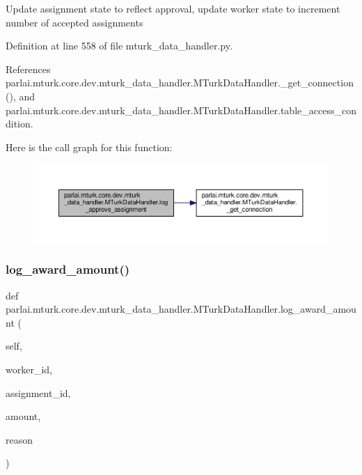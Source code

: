 \begin{DoxyVerb}Update assignment state to reflect approval, update worker state to
increment number of accepted assignments
\end{DoxyVerb}
 

Definition at line 558 of file mturk\+\_\+data\+\_\+handler.\+py.



References parlai.\+mturk.\+core.\+dev.\+mturk\+\_\+data\+\_\+handler.\+M\+Turk\+Data\+Handler.\+\_\+get\+\_\+connection(), and parlai.\+mturk.\+core.\+dev.\+mturk\+\_\+data\+\_\+handler.\+M\+Turk\+Data\+Handler.\+table\+\_\+access\+\_\+condition.

Here is the call graph for this function\+:
\nopagebreak
\begin{figure}[H]
\begin{center}
\leavevmode
\includegraphics[width=350pt]{classparlai_1_1mturk_1_1core_1_1dev_1_1mturk__data__handler_1_1MTurkDataHandler_a57266a8380587e0256b966ad780ec7d7_cgraph}
\end{center}
\end{figure}
\mbox{\label{classparlai_1_1mturk_1_1core_1_1dev_1_1mturk__data__handler_1_1MTurkDataHandler_a70ba0bf16c83138626c33c71a041674f}} 
\subsubsection{\texorpdfstring{log\+\_\+award\+\_\+amount()}{log\_award\_amount()}}
{\footnotesize\ttfamily def parlai.\+mturk.\+core.\+dev.\+mturk\+\_\+data\+\_\+handler.\+M\+Turk\+Data\+Handler.\+log\+\_\+award\+\_\+amount (\begin{DoxyParamCaption}\item[{}]{self,  }\item[{}]{worker\+\_\+id,  }\item[{}]{assignment\+\_\+id,  }\item[{}]{amount,  }\item[{}]{reason }\end{DoxyParamCaption})}


